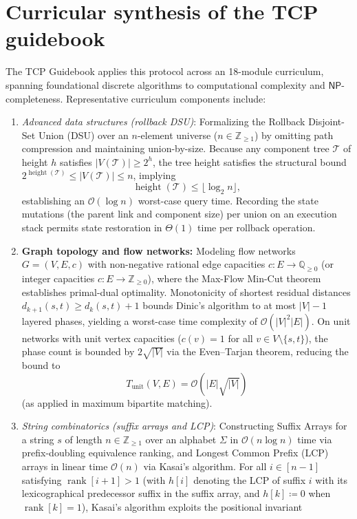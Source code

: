 \documentclass[10pt, letterpaper]{article}
\begin{document}
\section{Curricular synthesis of the TCP guidebook}\label{sec:curriculum}
The TCP Guidebook applies this protocol across an 18-module curriculum, spanning foundational discrete algorithms to computational complexity and $\mathsf{NP}$-completeness. Representative curriculum components include:

\begin{enumerate}
    \item \textit{Advanced data structures (rollback DSU)}: Formalizing the Rollback Disjoint-Set Union (DSU) over an $n$-element universe ($n \in \mathbb{Z}_{\ge 1}$) by omitting path compression and maintaining union-by-size. Because any component tree $\mathcal{T}$ of height $h$ satisfies $|V(\mathcal{T})| \ge 2^h$, the tree height satisfies the structural bound $2^{\operatorname{height}(\mathcal{T})} \le |V(\mathcal{T})| \le n$, implying
	\begin{equation}\label{eq:dsu_depth}
		\operatorname{height}(\mathcal{T}) \le \lfloor \log_2 n \rfloor,
	\end{equation}
	establishing an $\mathcal{O}(\log n)$ worst-case query time. Recording the state mutations (the parent link and component size) per union on an execution stack permits state restoration in $\Theta(1)$ time per rollback operation.
    \item \textbf{Graph topology and flow networks:} Modeling flow networks $G=(V, E, c)$ with non-negative rational edge capacities $c: E \to \mathbb{Q}_{\ge 0}$ (or integer capacities $c: E \to \mathbb{Z}_{\ge 0}$), where the Max-Flow Min-Cut theorem establishes primal-dual optimality. Monotonicity of shortest residual distances $d_{k+1}(s, t) \ge d_k(s, t) + 1$ bounds Dinic's algorithm to at most $|V|-1$ layered phases, yielding a worst-case time complexity of $\mathcal{O}(|V|^2|E|)$. On unit networks with unit vertex capacities ($c(v) = 1$ for all $v \in V \setminus \{s, t\}$), the phase count is bounded by $2\sqrt{|V|}$ via the Even--Tarjan theorem, reducing the bound to
	\begin{equation}\label{eq:dinic_complexity}
		T_{\text{unit}}(V, E) = \mathcal{O}(|E|\sqrt{|V|})
	\end{equation}
	(as applied in maximum bipartite matching).
    \item \textit{String combinatorics (suffix arrays and LCP)}: Constructing Suffix Arrays for a string $s$ of length $n \in \mathbb{Z}_{\ge 1}$ over an alphabet $\Sigma$ in $\mathcal{O}(n \log n)$ time via prefix-doubling equivalence ranking, and Longest Common Prefix (LCP) arrays in linear time $\mathcal{O}(n)$ via Kasai's algorithm. For all $i \in [n-1]$ satisfying $\operatorname{rank}[i+1] > 1$ (with $h[i]$ denoting the LCP of suffix $i$ with its lexicographical predecessor suffix in the suffix array, and $h[k] \coloneqq 0$ when $\operatorname{rank}[k]=1$), Kasai's algorithm exploits the positional invariant

\end{enumerate}
\end{document}
